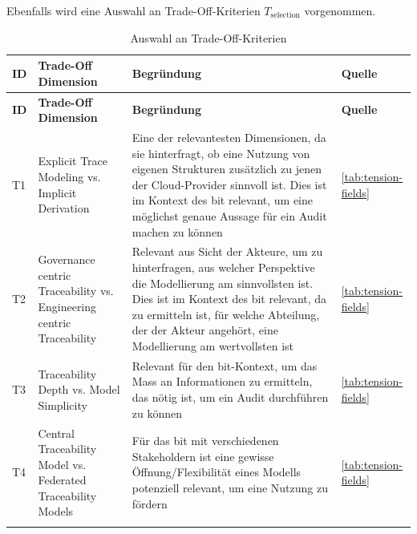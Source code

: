 Ebenfalls wird eine Auswahl an Trade-Off-Kriterien $T_{\text{selection}}$ vorgenommen.

\begin{longtable}{|
  L{1cm}|
  p{\dimexpr(\textwidth-4cm-8\arrayrulewidth)/2\relax}|
  p{\dimexpr(\textwidth-4cm-8\arrayrulewidth)/2\relax}|
  L{3cm}|
}
    \hline
    \textbf{ID} & \textbf{Trade-Off Dimension} & \textbf{Begründung} & \textbf{Quelle} \\
    \hline
    \endfirsthead

    \hline
    \textbf{ID} & \textbf{Trade-Off Dimension} & \textbf{Begründung} & \textbf{Quelle} \\
    \hline
    \endhead

    T1 & Explicit Trace Modeling vs. Implicit Derivation \hypertarget{tradeoff-t1}{} & Eine der relevantesten Dimensionen, da sie hinterfragt, ob eine Nutzung von eigenen Strukturen zusätzlich zu jenen der Cloud-Provider sinnvoll ist. Dies ist im Kontext des \ac{bit} relevant, um eine möglichst genaue Aussage für ein Audit machen zu können & \autoref{tab:tension-fields}
    \\
    \hline

    T2 & Governance centric Traceability vs. Engineering centric Traceability \hypertarget{tradeoff-t2}{} & Relevant aus Sicht der Akteure, um zu hinterfragen, aus welcher Perspektive die Modellierung am sinnvollsten ist. Dies ist im Kontext des \ac{bit} relevant, da zu ermitteln ist, für welche Abteilung, der der Akteur angehört, eine Modellierung am wertvollsten ist & \autoref{tab:tension-fields}
    \\
    \hline

    T3 & Traceability Depth vs. Model Simplicity \hypertarget{tradeoff-t3}{} & Relevant für den \ac{bit}-Kontext, um das Mass an Informationen zu ermitteln, das nötig ist, um ein Audit durchführen zu können & \autoref{tab:tension-fields}
    \\
    \hline

    T4 & Central Traceability Model vs. Federated Traceability Models \hypertarget{tradeoff-t4}{} & Für das \ac{bit} mit verschiedenen Stakeholdern ist eine gewisse Öffnung/Flexibilität eines Modells potenziell relevant, um eine Nutzung zu fördern & \autoref{tab:tension-fields}
    \\
    \hline

    \caption{Auswahl an Trade-Off-Kriterien}
    \label{tab:selection-tradeoff}
\end{longtable}